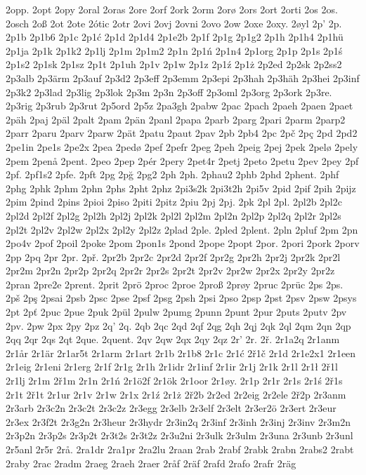 2opp.
2opt
2opy
2oral
2oras
2ore
2orf
2ork
2orm
2orø
2ors
2ort
2orti
2os
2os.
2osch
2oß
2ot
2ote
2ótic
2otr
2ovi
2ovj
2ovni
2ovo
2ow
2oxe
2oxy.
2øyl
2p'
2p.
2p1b
2p1b6
2p1c
2p1ć
2p1d
2p1d4
2p1e2b
2p1f
2p1g
2p1g2
2p1h
2p1h4
2p1hü
2p1ja
2p1k
2p1k2
2p1lj
2p1m
2p1m2
2p1n
2p1ń
2p1n4
2p1org
2p1p
2p1s
2p1ś
2p1s2
2p1sk
2p1sz
2p1t
2p1uh
2p1v
2p1w
2p1z
2p1ź
2p1ż
2p2ed
2p2sk
2p2ss2
2p3alb
2p3ärm
2p3auf
2p3d2
2p3eff
2p3emm
2p3epi
2p3hah
2p3häh
2p3hei
2p3inf
2p3k2
2p3lad
2p3lig
2p3lok
2p3m
2p3n
2p3off
2p3oml
2p3org
2p3ork
2p3re.
2p3rig
2p3rub
2p3rut
2p5ord
2p5z
2pa3gh
2pabw
2pac
2pach
2paeh
2paen
2paet
2päh
2paj
2päl
2palt
2pam
2pän
2panl
2papa
2parb
2parg
2pari
2parm
2parp2
2parr
2paru
2parv
2parw
2pät
2patu
2paut
2pav
2pb
2pb4
2pc
2pč
2pç
2pd
2pd2
2pe1in
2pe1s
2pe2x
2pea
2pedø
2pef
2pefr
2peg
2peh
2peig
2pej
2pek
2pelø
2pely
2pem
2penå
2pent.
2peo
2pep
2pér
2pery
2pet4r
2petj
2peto
2petu
2pev
2pey
2pf
2pf.
2pf1s2
2pfe.
2pft
2pg
2pğ
2pg2
2ph
2ph.
2phau2
2phb
2phd
2phent.
2phf
2phg
2phk
2phm
2phn
2phs
2pht
2phz
2pi3s2k
2pi3t2h
2pi5v
2pid
2pif
2pih
2pijz
2pim
2pind
2pins
2pioi
2piso
2piti
2pitz
2piu
2pj
2pj.
2pk
2pl
2pl.
2pl2b
2pl2c
2pl2d
2pl2f
2pl2g
2pl2h
2pl2j
2pl2k
2pl2l
2pl2m
2pl2n
2pl2p
2pl2q
2pl2r
2pl2s
2pl2t
2pl2v
2pl2w
2pl2x
2pl2y
2pl2z
2plad
2ple.
2pled
2plent.
2pln
2pluf
2pm
2pn
2po4v
2pof
2poil
2poke
2pom
2pon1s
2pond
2pope
2popt
2por.
2pori
2pork
2porv
2pp
2pq
2pr
2pr.
2př.
2pr2b
2pr2c
2pr2d
2pr2f
2pr2g
2pr2h
2pr2j
2pr2k
2pr2l
2pr2m
2pr2n
2pr2p
2pr2q
2pr2r
2pr2s
2pr2t
2pr2v
2pr2w
2pr2x
2pr2y
2pr2z
2pran
2pre2e
2prent.
2prit
2prö
2proc
2proe
2proß
2prøy
2pruc
2prüc
2ps
2ps.
2pš
2pş
2psai
2psb
2psc
2pse
2psf
2psg
2psh
2psi
2pso
2psp
2pst
2psv
2psw
2psys
2pt
2pť
2puc
2pue
2puk
2pül
2pulw
2pumg
2punn
2punt
2pur
2puts
2putv
2pv
2pv.
2pw
2px
2py
2pz
2q'
2q.
2qb
2qc
2qd
2qf
2qg
2qh
2qj
2qk
2ql
2qm
2qn
2qp
2qq
2qr
2qs
2qt
2que.
2quent.
2qv
2qw
2qx
2qy
2qz
2r'
2r.
2ř.
2r1a2q
2r1anm
2r1år
2r1är
2r1ar5t
2r1arm
2r1art
2r1b
2r1b8
2r1c
2r1ć
2ř1č
2r1d
2r1e2x1
2r1een
2r1eig
2r1eni
2r1erg
2r1f
2r1g
2r1h
2r1idr
2r1inf
2r1ir
2r1j
2r1k
2r1l
2r1ł
2ř1l
2r1lj
2r1m
2ř1m
2r1n
2r1ń
2r1ö2f
2r1ök
2r1oor
2r1øy.
2r1p
2r1r
2r1s
2r1ś
2ř1s
2r1t
2ř1t
2r1ur
2r1v
2r1w
2r1x
2r1ź
2r1ż
2ř2b
2r2ed
2r2eig
2r2ele
2ř2p
2r3anm
2r3arb
2r3c2n
2r3c2t
2r3c2z
2r3egg
2r3elb
2r3elf
2r3elt
2r3er2ö
2r3ert
2r3eur
2r3ex
2r3f2t
2r3g2n
2r3heur
2r3hydr
2r3in2q
2r3inf
2r3inh
2r3inj
2r3inv
2r3m2n
2r3p2n
2r3p2s
2r3p2t
2r3t2s
2r3t2z
2r3u2ni
2r3ulk
2r3ulm
2r3una
2r3unb
2r3unl
2r5anl
2r5r
2rå.
2ra1dr
2ra1pr
2ra2lu
2raan
2rab
2rabf
2rabk
2rabn
2rabs2
2rabt
2raby
2rac
2radm
2raeg
2raeh
2raer
2råf
2räf
2rafd
2rafo
2rafr
2räg
